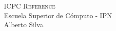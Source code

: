 \documentclass[12pt]{article}
\begin{document}
\begin{center}
  \Huge\textsc{ICPC Reference}\\
  \vspace{0.30cm}
  \huge Escuela Superior de Cómputo - IPN\\
  \vspace{0.20cm}
  \small Alberto Silva
\end{center}
\hrulefill
\begin{multicols}{1}
  \tableofcontents	
  \clearpage

  
  
  
\end{multicols}
\end{document}
